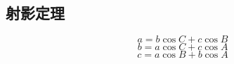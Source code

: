\documentclass[a4paper, fleqn, fontset = mac]{ctexart}
\newcommand{\diform}{\noindent}
\begin{document}
\begin{multicols}{2}
		\section{射影定理}
	\diform
	\[ a = b \cos C + c \cos B \]
	\[ b = a \cos C + c \cos A \]
	\[ c = a \cos B + b \cos A \]

	\end{multicols}
\end{document}

